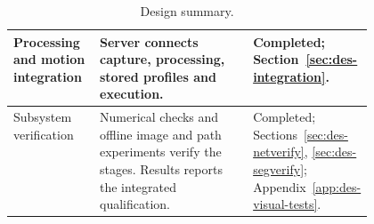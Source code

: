 \begin{table}[!htbp]
\begin{tabularx}{\linewidth}{|>{\raggedright\arraybackslash}p{0.24\linewidth}|>{\raggedright\arraybackslash}X|>{\raggedright\arraybackslash}p{0.23\linewidth}|}
Processing and motion integration&Server connects capture, processing, stored profiles and execution.&Completed; Section~\ref{sec:des-integration}.\\\hline
Subsystem verification&Numerical checks and offline image and path experiments verify the stages. Results reports the integrated qualification.&Completed; Sections~\ref{sec:des-netverify}, \ref{sec:des-segverify}; Appendix~\ref{app:des-visual-tests}.\\\hline
\end{tabularx}
\caption{Design summary.}
\label{tab:des-summary}
\end{table}

\FloatBarrier
